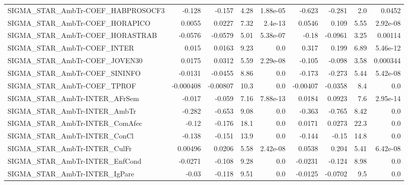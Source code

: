 \begin{tabular}{lrrrrrrrr}
SIGMA\_STAR\_AmbTr-COEF\_HABPROSOCF3      &      -0.128 &       -0.157 &     4.28 & 1.88e-05 &     -0.623 &      -0.281 &          2.0 &        0.0452 \\
SIGMA\_STAR\_AmbTr-COEF\_HORAPICO         &      0.0055 &       0.0227 &     7.32 &  2.4e-13 &     0.0546 &       0.109 &         5.55 &      2.92e-08 \\
SIGMA\_STAR\_AmbTr-COEF\_HORASTRAB        &     -0.0576 &      -0.0579 &     5.01 & 5.38e-07 &      -0.18 &     -0.0961 &         3.25 &       0.00114 \\
SIGMA\_STAR\_AmbTr-COEF\_INTER            &       0.015 &       0.0163 &     9.23 &      0.0 &      0.317 &       0.199 &         6.89 &      5.46e-12 \\
SIGMA\_STAR\_AmbTr-COEF\_JOVEN30          &      0.0175 &       0.0312 &     5.59 & 2.29e-08 &     -0.105 &      -0.098 &         3.58 &      0.000344 \\
SIGMA\_STAR\_AmbTr-COEF\_SININFO          &     -0.0131 &      -0.0455 &     8.86 &      0.0 &     -0.173 &      -0.273 &         5.44 &      5.42e-08 \\
SIGMA\_STAR\_AmbTr-COEF\_TPROF            &   -0.000408 &     -0.00807 &     10.3 &      0.0 &   -0.00407 &     -0.0358 &          8.4 &           0.0 \\
SIGMA\_STAR\_AmbTr-INTER\_AFrSem          &      -0.017 &       -0.059 &     7.16 & 7.88e-13 &     0.0184 &      0.0923 &          7.6 &      2.95e-14 \\
SIGMA\_STAR\_AmbTr-INTER\_AmbTr           &      -0.282 &       -0.653 &     9.08 &      0.0 &     -0.363 &      -0.765 &         8.42 &           0.0 \\
SIGMA\_STAR\_AmbTr-INTER\_ComAfec         &       -0.12 &       -0.176 &     18.1 &      0.0 &     0.0171 &      0.0273 &         22.3 &           0.0 \\
SIGMA\_STAR\_AmbTr-INTER\_ConCl           &      -0.138 &       -0.151 &     13.9 &      0.0 &     -0.144 &       -0.15 &         14.8 &           0.0 \\
SIGMA\_STAR\_AmbTr-INTER\_CulFr           &     0.00496 &       0.0206 &     5.58 & 2.42e-08 &     0.0538 &       0.204 &         5.41 &      6.42e-08 \\
SIGMA\_STAR\_AmbTr-INTER\_EnfCond         &     -0.0271 &       -0.108 &     9.28 &      0.0 &    -0.0231 &      -0.124 &         8.98 &           0.0 \\
SIGMA\_STAR\_AmbTr-INTER\_IgPare          &       -0.03 &       -0.118 &     9.51 &      0.0 &    -0.0125 &     -0.0702 &          9.5 &           0.0 \\

\end{tabular}
